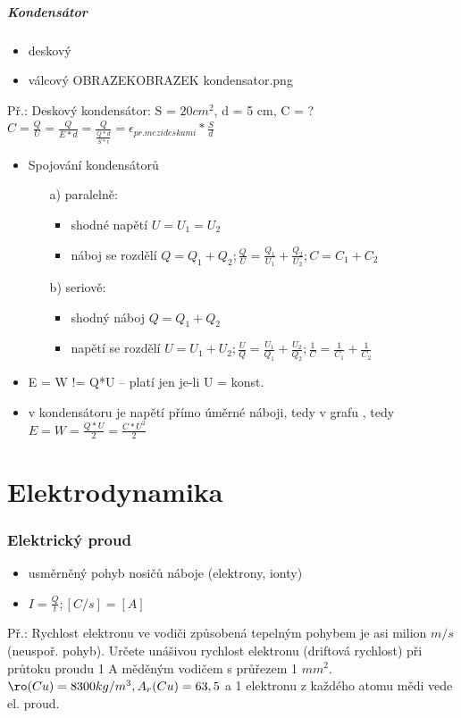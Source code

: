 \documentclass{article}
\begin{document}
\subsubsection{Kondensátor}
\begin{itemize}
  \item deskový
  \item válcový OBRAZEKOBRAZEK kondensator.png
\end{itemize}
Př.: Deskový kondensátor: S = $20 cm^2$, d = 5 cm, C = ?\\
$C = \frac{Q}{U}=\frac{Q}{E*d}=\frac{Q}{\frac{Q*d}{S*\epsilon}} = \epsilon_{pr. mezi deskami} * \frac{S}{d}$
\begin{itemize}
  \item Spojování kondensátorů
  \begin{itemize}
    \item[a)] paralelně:
    \begin{itemize}
      \item shodné napětí $U = U_1 = U_2$
      \item náboj se rozdělí $Q = Q_1 + Q_2; \frac{Q}{U} = \frac{Q_1}{U_1} + \frac{Q_2}{U_2}; C = C_1 + C_2$
    \end{itemize}
    \item[b)] seriově:
    \begin{itemize}
      \item shodný náboj $Q = Q_1 + Q_2$
      \item napětí se rozdělí $U = U_1 + U_2; \frac{U}{Q} = \frac{U_1}{Q_1} + \frac{U_2}{Q_2}; \frac{1}{C} = \frac{1}{C_1} + \frac{1}{C_2}$
    \end{itemize}
  \end{itemize}
  \item E = W != Q*U -- platí jen je-li U = konst.
  \item v kondensátoru je napětí přímo úměrné náboji, tedy v grafu , tedy $E = W = \frac{Q*U}{2} = \frac{C*U^2}{2}$
\end{itemize}

\part{Elektrodynamika}
\section{Elektrický proud}
\begin{itemize}
  \item usměrněný pohyb nosičů náboje (elektrony, ionty)
  \item $I = \frac{Q}{t}; [C/s] = [A]$
\end{itemize}
Př.: Rychlost elektronu ve vodiči způsobená tepelným pohybem je asi milion $m/s$ (neuspoř. pohyb). Určete unášivou rychlost elektronu (driftová rychlost) při průtoku proudu 1 A měděným vodičem s průřezem 1 $mm^2$. $\ro (Cu) = 8300 kg/m^3, A_r (Cu) = 63,5$ a 1 elektronu z každého atomu mědi vede el. proud.
\end{document}
